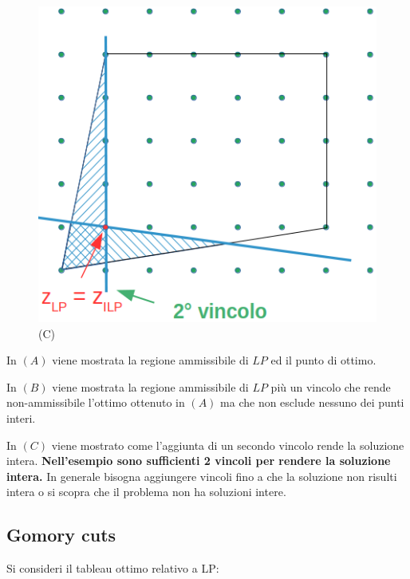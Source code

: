 \begin{figure}[!htb]
	\includegraphics[width=\linewidth]{images/graph11.png}
	(C)
	\label{fig:paniditaglio3}
	\endminipage
\end{figure}

In $(A)$ viene mostrata la regione ammissibile di $LP$ ed il punto di ottimo.

In $(B)$ viene mostrata la regione ammissibile di $LP$ più un vincolo che rende non-ammissibile l'ottimo ottenuto in $(A)$ ma che non esclude nessuno dei punti interi.

In $(C)$ viene mostrato come l'aggiunta di un secondo vincolo rende la soluzione intera.
\newline
\newline
\textbf{Nell'esempio sono sufficienti 2 vincoli per rendere la soluzione intera.}
\newline
\newline
In generale bisogna aggiungere vincoli fino a che la soluzione non risulti intera o si scopra che il problema non ha soluzioni intere.

\subsection{Gomory cuts}
Si consideri il tableau ottimo relativo a LP:

